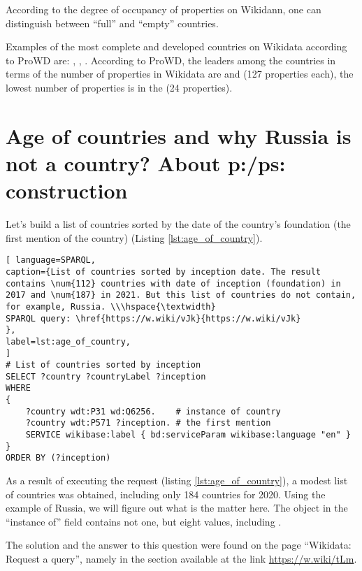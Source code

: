 According to the degree of occupancy of properties on Wikidann, one can distinguish between ``full'' and ``empty'' countries.

Examples of the most complete and developed countries on Wikidata according to ProWD are: , , . According to ProWD, the leaders among the countries in terms of the number of properties in Wikidata are  and  (127 properties each), the lowest number of properties is in the   (24 properties).


\section{Age of countries and why Russia is not a country? About p:/ps: construction}

Let's build a list of countries sorted by the date of the country's foundation (the first mention of the country) (Listing \ref{lst:age_of_country}).

\begin{lstlisting}[ language=SPARQL, 
caption={List of countries sorted by inception date. The result contains \num{112} countries with date of inception (foundation) in 2017 and \num{187} in 2021. But this list of countries do not contain, for example, Russia. \\\hspace{\textwidth}
SPARQL query: \href{https://w.wiki/vJk}{https://w.wiki/vJk}
},
label=lst:age_of_country, 					
]
# List of countries sorted by inception 
SELECT ?country ?countryLabel ?inception
WHERE
{
	?country wdt:P31 wd:Q6256.    # instance of country
	?country wdt:P571 ?inception. # the first mention
	SERVICE wikibase:label { bd:serviceParam wikibase:language "en" }
}
ORDER BY (?inception)
\end{lstlisting}

As a result of executing the request (listing \ref{lst:age_of_country}), a modest list of countries was obtained, including only 184 countries for 2020. Using the example of Russia, we will figure out what is the matter here. The  object in the ``instance of'' field contains not one, but eight values, including .

The solution and the answer to this question were found on the page ``Wikidata: Request a query'', namely in the section available at the link \href{https://w.wiki/tLm}{https://w.wiki/tLm}.

